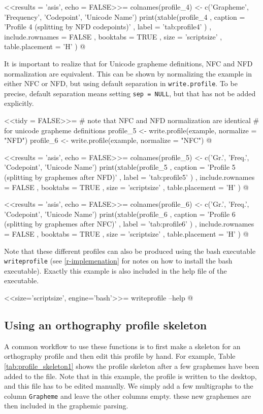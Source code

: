 <<results = 'asis', echo = FALSE>>=
colnames(profile_4) <- c('Grapheme', 'Frequency', 'Codepoint', 'Unicode Name')
print(xtable(profile_4
        , caption = 'Profile 4 (splitting by NFD codepoints)'
        , label = 'tab:profile4'
        )
  , include.rownames = FALSE
  , booktabs = TRUE
  , size = 'scriptsize'
  , table.placement = 'H'
  )
@

It is important to realize that for Unicode grapheme definitions, NFC
and NFD normalization are equivalent. This can be shown by normalizing the
example in either NFC or NFD, but using default separation in
\texttt{write.profile}. To be precise, default separation means setting
\texttt{sep~=~NULL}, but that has not be added explicitly.

<<tidy = FALSE>>=
# note that NFC and NFD normalization are identical
# for unicode grapheme definitions
profile_5 <- write.profile(example, normalize = "NFD")
profile_6 <- write.profile(example, normalize = "NFC")
@

<<results = 'asis', echo = FALSE>>=
colnames(profile_5) <- c('Gr.', 'Freq.', 'Codepoint', 'Unicode Name')
print(xtable(profile_5
        , caption = 'Profile 5 (splitting by graphemes after NFD)'
        , label = 'tab:profile5'
        )
  , include.rownames = FALSE
  , booktabs = TRUE
  , size = 'scriptsize'
  , table.placement = 'H'
  )
@

<<results = 'asis', echo = FALSE>>=
colnames(profile_6) <- c('Gr.', 'Freq.', 'Codepoint', 'Unicode Name')
print(xtable(profile_6
        , caption = 'Profile 6 (splitting by graphemes after NFC)'
        , label = 'tab:profile6'
        )
  , include.rownames = FALSE
  , booktabs = TRUE
  , size = 'scriptsize'
  , table.placement = 'H'
  )
@

Note that these different profiles can also be produced using the bash
executable \texttt{writeprofile} (see \ref{r-implemenation} for notes
on how to install the bash executable). Exactly this example is also included in
the help file of the executable.

<<size='scriptsize', engine='bash'>>=
writeprofile --help
@

\subsection*{Using an orthography profile skeleton}
\label{profile-skeleton}

A common workflow to use these functions is to first make a skeleton for an
orthography profile and then edit this profile by hand. For example, Table
\ref{tab:profile_skeleton1} shows the profile skeleton after a few graphemes have
been added to the file. Note that in this example, the profile is written to the
desktop, and this file has to be edited manually. We simply add a few
multigraphs to the column \texttt{Grapheme} and leave the other columns empty.
these new graphemes are then included in the graphemic parsing.

